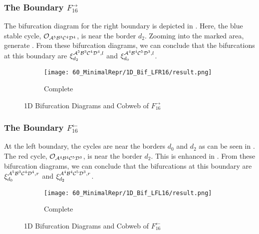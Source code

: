 \subsubsection{The Boundary $F_{16}^\rightarrow$}


The bifurcation diagram for the right boundary is depicted in .
Here, the blue stable cycle, $\mathcal{O}_{\mathcal{A}^5\mathcal{B}^3\mathcal{C}^4\mathcal{D}^4}$, is near the border $d_2$.
Zooming into the marked area, generate .
From these bifurcation diagrams, we can conclude that the bifurcations at this boundary are $\xi_{d_2}^{\mathcal{A}^5\mathcal{B}^3\mathcal{C}^4\mathcal{D}^4, l}$ and $\xi_{d_0}^{\mathcal{A}^4\mathcal{B}^4\mathcal{C}^5\mathcal{D}^3, l}$.

\begin{figure}
    \centering
    \begin{subfigure}{0.4\textwidth}
        \centering
        \texttt{[image: 60\_MinimalRepr/1D\_Bif\_LFR16/result.png]}
        \caption{Complete}
        \label{fig:final.bifurcation.F.right}
    \end{subfigure}
    \caption{1D Bifurcation Diagrams and Cobweb of $F_{16}^\rightarrow$}
\end{figure}

\subsubsection{The Boundary $F_{16}^\leftarrow$}

At the left boundary, the cycles are near the borders $d_0$ and $d_2$ as can be seen in .
The red cycle, $\mathcal{O}_{\mathcal{A}^4\mathcal{B}^4\mathcal{C}^5\mathcal{D}^3}$, is near the border $d_2$.
This is enhanced in .
From these bifurcation diagrams, we can conclude that the bifurcations at this boundary are $\xi_{d_0}^{\mathcal{A}^5\mathcal{B}^3\mathcal{C}^4\mathcal{D}^4, r}$ and $\xi_{d_2}^{\mathcal{A}^4\mathcal{B}^4\mathcal{C}^5\mathcal{D}^3, r}$.

\begin{figure}
    \centering
    \begin{subfigure}{0.4\textwidth}
        \centering
        \texttt{[image: 60\_MinimalRepr/1D\_Bif\_LFL16/result.png]}
        \caption{Complete}
        \label{fig:final.bifurcation.F.left}
    \end{subfigure}
    \caption{1D Bifurcation Diagrams and Cobweb of $F_{16}^\leftarrow$}
\end{figure}

